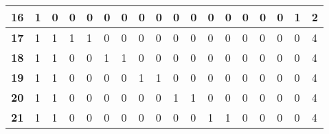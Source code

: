 \begin{table}[]
{\begin{tabular}{|P{0.6cm}|P{0.65cm}|P{0.65cm}|P{0.65cm}|P{0.65cm}|P{0.65cm}|P{0.65cm}|P{0.65cm}|P{0.65cm}|P{0.65cm}|P{0.65cm}|P{0.65cm}|P{0.65cm}|P{0.65cm}|P{0.65cm}|P{0.65cm}|P{0.65cm}|P{2.9cm}|}
\textbf{16}                        & 1                     & 0                     & 0                     & 0                     & 0                     & 0                     & 0                     & 0                     & 0                     & 0                     & 0                     & 0                     & 0                     & 0                     & 0                     & 1                     & 2                     \\ \hline
\textbf{17}                        & 1                     & 1                     & 1                     & 1                     & 0                     & 0                     & 0                     & 0                     & 0                     & 0                     & 0                     & 0                     & 0                     & 0                     & 0                     & 0                     & 4                     \\ \hline
\textbf{18}                        & 1                     & 1                     & 0                     & 0                     & 1                     & 1                     & 0                     & 0                     & 0                     & 0                     & 0                     & 0                     & 0                     & 0                     & 0                     & 0                     & 4                     \\ \hline
\textbf{19}                        & 1                     & 1                     & 0                     & 0                     & 0                     & 0                     & 1                     & 1                     & 0                     & 0                     & 0                     & 0                     & 0                     & 0                     & 0                     & 0                     & 4                     \\ \hline
\textbf{20}                        & 1                     & 1                     & 0                     & 0                     & 0                     & 0                     & 0                     & 0                     & 1                     & 1                     & 0                     & 0                     & 0                     & 0                     & 0                     & 0                     & 4                     \\ \hline
\textbf{21}                        & 1                     & 1                     & 0                     & 0                     & 0                     & 0                     & 0                     & 0                     & 0                     & 0                     & 1                     & 1                     & 0                     & 0                     & 0                     & 0                     & 4                     \\ \hline

\end{tabular}}
\end{table}

